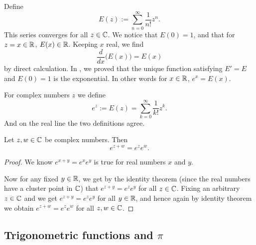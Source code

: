Define
\begin{equation*}
E(z) := \sum_{n=0}^\infty \frac{1}{n!} z^n .
\end{equation*}
This series converges for all $z \in {\mathbb{C}}$.   We notice that $E(0) = 1$,
and that for $z=x \in {\mathbb{R}}$, $E(x) \in {\mathbb{R}}$.  Keeping $x$ real, we find
\begin{equation*}
\frac{d}{dx} \bigl( E(x) \bigr) = E(x)
\end{equation*}
by direct calculation.
In , we proved that
the unique function satisfying $E' = E$ and
$E(0) = 1$ is the exponential.  In other words for $x \in {\mathbb{R}}$, $e^x = E(x)$.

For complex numbers $z$ we define
\begin{equation*}
e^z := E(z) = 
\sum_{k=0}^\infty \frac{1}{k!} z^k .
\end{equation*}
And on the real line the two definitions agree.

\begin{prop}
Let $z,w \in {\mathbb{C}}$ be complex numbers.  Then
\begin{equation*}
e^{z+w} = e^z e^w.
\end{equation*}
\end{prop}

\begin{proof}
We know
$e^{x+y} = e^x e^y$ is true for
real numbers $x$ and $y$.

Now for any fixed $y \in {\mathbb{R}}$, we get by the
identity theorem (since the real numbers have a cluster point in ${\mathbb{C}}$) that
$e^{z+y} = e^ze^y$ for all $z \in {\mathbb{C}}$.  Fixing an arbitrary $z \in {\mathbb{C}}$
and we get
$e^{z+y} = e^ze^y$ for all $y \in {\mathbb{R}}$, and hence again by identity theorem we obtain
$e^{z+w} = e^z e^w$
for all $z,w \in {\mathbb{C}}$.
\end{proof}

\subsection{Trigonometric functions and $\pi$}


